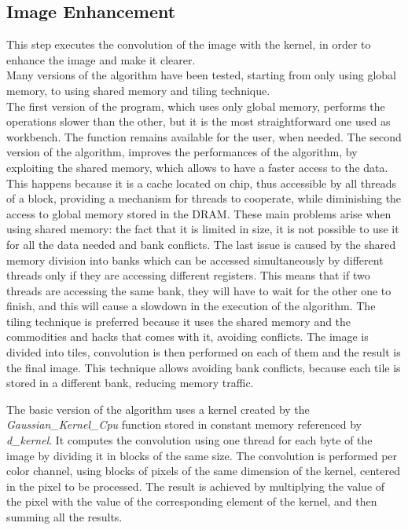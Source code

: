     \subsection{Image Enhancement}
    This step executes the convolution of the image with the kernel, in order to enhance the image and make it clearer.\\
    Many versions of the algorithm have been tested, starting from only using global memory, to using shared memory and tiling technique.\\
    The first version of the program, which uses only global memory, performs the operations slower than the other,
    but it is the most straightforward one used as workbench. The function remains available for the user, when needed. The second version of the algorithm, improves the performances of the algorithm, by exploiting the shared memory,
    which allows to have a faster access to the data. This happens because it is a cache located on chip, thus accessible by all threads of a block, 
    providing a mechanism for threads to cooperate, while diminishing the access to global memory stored in the DRAM.
    These main problems arise when using shared memory: the fact that it is limited in size, it is not possible to use it for all the data needed 
    and bank conflicts. The last issue is caused by the shared memory division into banks which can be accessed simultaneously by different threads
    only if they are accessing different registers. This means that if two threads are accessing the same bank, they will have to wait for the other one to finish,
    and this will cause a slowdown in the execution of the algorithm.
    The tiling technique is preferred because it uses the shared memory and the commodities and hacks that comes with it, avoiding conflicts.
    The image is divided into tiles, convolution is then performed on each of them and the result is the final image. This technique allows avoiding bank conflicts, because each tile is stored in a different
    bank, reducing memory traffic.
    
    \noindent The basic version of the algorithm uses a kernel created by the \textit{Gaussian\_Kernel\_Cpu} function stored in constant memory referenced by \textit{d\_kernel}. 
    It computes the convolution using one thread for each byte of the image by dividing it in blocks of the same size. 
    The convolution is performed per color channel, using blocks of pixels of the same dimension of the kernel, centered in the pixel to be processed.
    The result is achieved by multiplying the value of the pixel with the value of the corresponding element of the kernel, and then summing all the results.

